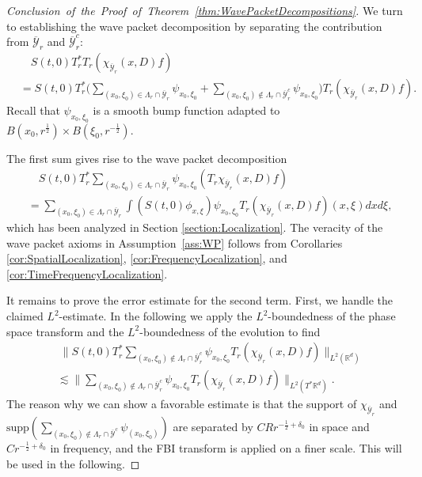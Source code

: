 \documentclass{amsart}
\theoremstyle{definition}
\newcommand{\R}{\mathbb{R}}
\begin{document}
\begin{proof}[Conclusion~of~the~Proof~of~Theorem~\ref{thm:WavePacketDecompositions}]
    We turn to establishing the wave packet decomposition by separating the contribution from $\overline{\mathcal{Y}}_r$ and $\overline{\mathcal{Y}}_r^c$:  
    \begin{equation*}
    \begin{split}
    		&\quad S(t,0) T_r^* T_r (\chi_{\overline{\mathcal{Y}}_r}(x,D) f) \\
    	 &= S(t,0) T_r^* \big( \sum_{(x_0,\xi_0) \in \Lambda_r \cap \overline{\mathcal{Y}}_r} \psi_{x_0,\xi_0} +  \sum_{(x_0,\xi_0) \notin \Lambda_r \cap \overline{\mathcal{Y}}_r^c} \psi_{x_0,\xi_0} \big) T_r (\chi_{\overline{\mathcal{Y}}_r}(x,D) f).
    	\end{split}
    \end{equation*}
    Recall that $\psi_{x_0,\xi_0}$ is a smooth bump function adapted to $B(x_0,r^{\frac{1}{2}}) \times B(\xi_0,r^{-\frac{1}{2}})$.
    
	The first sum gives rise to the wave packet decomposition
	\begin{equation*}
	\begin{split}
		&\quad S(t,0) T_r^* \sum_{(x_0,\xi_0) \in \Lambda_r \cap \overline{\mathcal{Y}}_r} \psi_{x_0,\xi_0} (T_r \chi_{\overline{\mathcal{Y}}_r}(x,D) f) \\
		&= \sum_{(x_0,\xi_0) \in \Lambda_r \cap \overline{\mathcal{Y}}_r} \int (S(t,0) \phi_{x,\xi}) \psi_{x_0,\xi_0} T_r(\chi_{\overline{\mathcal{Y}}_r}(x,D) f)(x,\xi) dx d\xi,
	\end{split}
	\end{equation*}	    
    which has been analyzed in Section \ref{section:Localization}. The veracity of the wave packet axioms in Assumption~\ref{ass:WP} follows from Corollaries \ref{cor:SpatialLocalization}, \ref{cor:FrequencyLocalization}, and \ref{cor:TimeFrequencyLocalization}.
    
\smallskip    
    
    It remains to prove the error estimate for the second term. First, we handle the claimed $L^2$-estimate. In the following we apply the $L^2$-boundedness of the phase space transform and the $L^2$-boundedness of the evolution to find
    \begin{equation*}
    \begin{split}
    		&\; \| S(t,0) T_r^* \sum_{(x_0,\xi_0) \notin \Lambda_r \cap \overline{\mathcal{Y}}_r^c} \psi_{x_0,\xi_0} T_r (\chi_{\overline{\mathcal{Y}}_r}(x,D) f) \|_{L^2(\R^d)} \\
    		&\lesssim \big\| \sum_{(x_0,\xi_0) \notin \Lambda_r \cap \overline{\mathcal{Y}}_r^c} \psi_{x_0,\xi_0} T_r (\chi_{\overline{\mathcal{Y}}_r}(x,D) f) \big\|_{L^2(T^* \R^d)}.
    	\end{split}
    \end{equation*}
   The reason why we can show a favorable estimate is that the support of $\chi_{\overline{\mathcal{Y}}_r}$ and $\text{supp}(\sum_{(x_0,\xi_0) \notin \Lambda_r \cap \overline{\mathcal{Y}}^c} \psi_{(x_0,\xi_0)} )$ are separated by $C R r^{-\frac{1}{2}+\delta_0}$ in space and $C r^{-\frac{1}{2}+\delta_0} $ in frequency, and the FBI transform is applied on a finer scale. This will be used in the following.


\end{proof}
\end{document}

